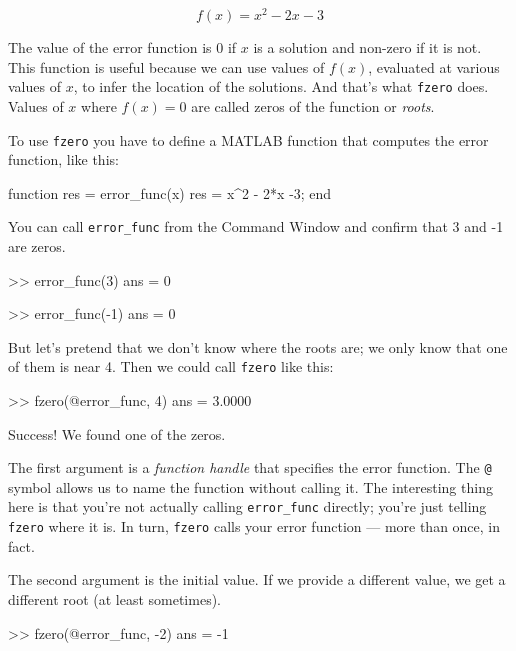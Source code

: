 \begin{equation}
f(x) = x^2 - 2x -3
\end{equation}

The value of the error function is 0 if $x$ is a solution and non-zero if it is not.
This function is useful because we can use values of $f(x)$, evaluated at various values of $x$, to infer the location of the solutions.  And that's what {\tt fzero} does.
Values of $x$ where $f(x) = 0$ are called zeros of the function or \emph{roots}.


To use {\tt fzero} you have to define a MATLAB function that computes the error function, like this:

\begin{code}
function res = error_func(x)
    res = x^2 - 2*x -3;
end
\end{code}

You can call \verb"error_func" from the Command Window and confirm that 3 and -1 are zeros.

\begin{code}
>> error_func(3)
ans = 0

>> error_func(-1)
ans = 0
\end{code}

But let's pretend that we don't know where the roots are; we only know that one of them is near 4.  Then we could call {\tt fzero} like this:

\begin{code}
>> fzero(@error_func, 4)
ans = 3.0000
\end{code}

Success!  We found one of the zeros.

The first argument is a {\em function handle} that specifies
the error function.  The {\tt @} symbol allows us to name the
function without calling it.  The interesting thing here is
that you're not actually calling \verb"error_func" directly;
you're just telling {\tt fzero} where it is.  In turn, {\tt fzero}
calls your error function --- more than once, in fact.


The second argument is the initial value.  If we provide a different
value, we get a different root (at least sometimes).

\begin{code}
>> fzero(@error_func, -2)
ans = -1
\end{code}

